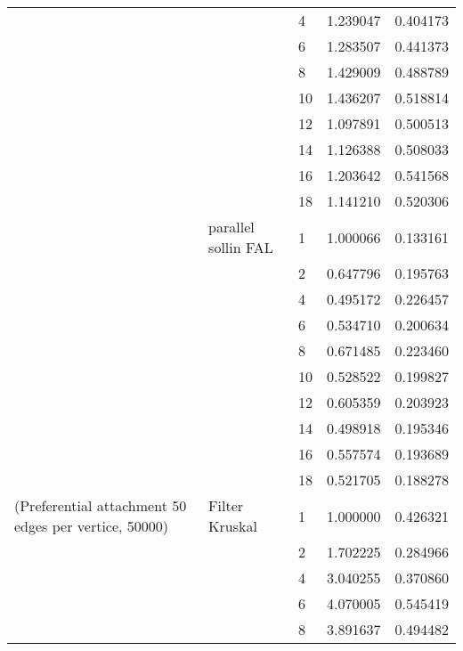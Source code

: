 \begin{tabular}{lllrr}
                      &                     & 4  &  1.239047 &  0.404173 \\
                      &                     & 6  &  1.283507 &  0.441373 \\
                      &                     & 8  &  1.429009 &  0.488789 \\
                      &                     & 10 &  1.436207 &  0.518814 \\
                      &                     & 12 &  1.097891 &  0.500513 \\
                      &                     & 14 &  1.126388 &  0.508033 \\
                      &                     & 16 &  1.203642 &  0.541568 \\
                      &                     & 18 &  1.141210 &  0.520306 \\
                      & parallel sollin FAL & 1  &  1.000066 &  0.133161 \\
                      &                     & 2  &  0.647796 &  0.195763 \\
                      &                     & 4  &  0.495172 &  0.226457 \\
                      &                     & 6  &  0.534710 &  0.200634 \\
                      &                     & 8  &  0.671485 &  0.223460 \\
                      &                     & 10 &  0.528522 &  0.199827 \\
                      &                     & 12 &  0.605359 &  0.203923 \\
                      &                     & 14 &  0.498918 &  0.195346 \\
                      &                     & 16 &  0.557574 &  0.193689 \\
                      &                     & 18 &  0.521705 &  0.188278 \\
(Preferential attachment 50 edges per vertice, 50000) & Filter Kruskal & 1  &  1.000000 &  0.426321 \\
                      &                     & 2  &  1.702225 &  0.284966 \\
                      &                     & 4  &  3.040255 &  0.370860 \\
                      &                     & 6  &  4.070005 &  0.545419 \\
                      &                     & 8  &  3.891637 &  0.494482 \\

\end{tabular}
